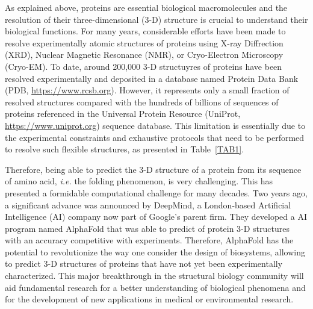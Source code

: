 As explained above, proteins are essential biological macromolecules and the resolution of their three-dimensional (3-D) structure is crucial to understand their biological functions. For many years, considerable efforts have been made to resolve experimentally atomic structures of proteins using X-ray Diffrection (XRD), Nuclear Magnetic Resonance (NMR), or Cryo-Electron Microscopy (Cryo-EM). To date, around 200,000 3-D structuyres of proteins have been resolved experimentally and deposited in a database named Protein Data Bank (PDB, \url{https://www.rcsb.org}). However, it represents only a small fraction of resolved structures compared with the hundreds of billions of sequences of proteins referenced in the Universal Protein Resource (UniProt, \url{https://www.uniprot.org}) sequence database. This limitation is essentially due to the experimental constraints and exhaustive protocols that need to be performed to resolve such flexible structures, as presented in Table~\ref{TAB1}.

Therefore, being able to predict the 3-D structure of a protein from its sequence of amino acid, \textit{i.e.} the folding phenomenon, is very challenging. This has presented a formidable computational challenge for many decades. Two years ago, a significant advance was announced by DeepMind, a London-based Artificial Intelligence (AI) company now part of Google’s parent firm. They developed a AI program named AlphaFold\cite{AlphaFold} that was able to predict of protein 3-D structures with an accuracy competitive with experiments. Therefore, AlphaFold has the potential to revolutionize the way one consider the design of biosystems, allowing to predict 3-D structures of proteins that have not yet been experimentally characterized. This major breakthrough in the structural biology community will aid fundamental research for a better understanding of biological phenomena and for the development of new applications in medical or environmental research.

